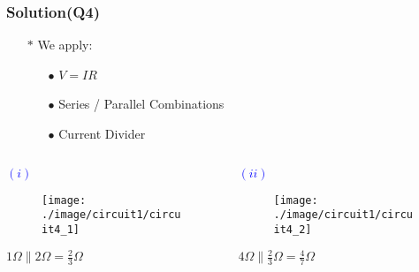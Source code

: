 \documentclass{beamer}
\newcommand{\blue}[1]{\textcolor{blue}{#1}}
\begin{document}

\begin{frame}
\frametitle{Solution(Q4)}
\begin{itemize} \itemsep1pt \parskip0pt 
  	\item[$\ast$] We apply:
  	\begin{itemize} \itemsep1pt \parskip0pt 
  		\item[$\bullet$] $V = IR$
  		\item[$\bullet$] Series / Parallel Combinations
  		\item[$\bullet$] Current Divider
  
	\end{itemize}
\end{itemize}

\begin{columns}
\begin{column}{6cm}


\blue{$(i)$}
\begin{figure}[H]
  \label{epi_circuit4_1}
  \centering
  \texttt{[image: ./image/circuit1/circuit4\_1]}
\end{figure}
\begin{center} $1 \Omega \parallel 2 \Omega = \frac{2}{3} \Omega$\end{center}
\end{column}

\begin{column}{6cm}

\blue{$(ii)$}
\begin{figure}[H]
  \label{epi_circuit4_2}
  \centering
  \texttt{[image: ./image/circuit1/circuit4\_2]}
\end{figure}
\center $4 \Omega \parallel \frac{2}{3} \Omega = \frac{4}{7} \Omega$


\end{column}
\end{columns}


\end{frame}

\end{document}
